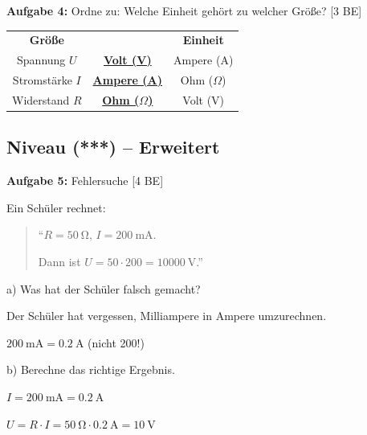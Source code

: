 \documentclass[11pt, a4paper]{article}
\newcommand{\lsg}[1]{\textcolor{loesung}{\textbf{\underline{#1}}}}
\newcommand{\niveauDrei}{\textcolor{stern3}{\textbf{(***)}}}}
\newcommand{\punkte}[1]{\hfill\textcolor{grau}{\small[#1 BE]}}
\begin{document}
\vspace{1em}

\textbf{Aufgabe 4:} Ordne zu: Welche Einheit gehört zu welcher Größe? \punkte{3}

\begin{center}
\begin{tabular}{ccc}
\textbf{Größe} & & \textbf{Einheit} \\[0.5em]
Spannung $U$ & \lsg{Volt (V)} & Ampere (A) \\
Stromstärke $I$ & \lsg{Ampere (A)} & Ohm ($\Omega$) \\
Widerstand $R$ & \lsg{Ohm ($\Omega$)} & Volt (V) \\
\end{tabular}
\end{center}

\vspace{1em}


\subsection*{Niveau \niveauDrei{} -- Erweitert}

\textbf{Aufgabe 5:} Fehlersuche \punkte{4}

Ein Schüler rechnet:

\begin{quote}
``$R = \SI{50}{\ohm}$, $I = \SI{200}{\milli\ampere}$.

Dann ist $U = 50 \cdot 200 = \SI{10000}{\volt}$.''
\end{quote}

a) Was hat der Schüler falsch gemacht?

\textcolor{loesung}{Der Schüler hat vergessen, Milliampere in Ampere umzurechnen.}

\textcolor{loesung}{$\SI{200}{\milli\ampere} = \SI{0,2}{\ampere}$ (nicht 200!)}

\vspace{0.5em}

b) Berechne das richtige Ergebnis.

\textcolor{loesung}{$I = \SI{200}{\milli\ampere} = \SI{0,2}{\ampere}$}

\textcolor{loesung}{$U = R \cdot I = \SI{50}{\ohm} \cdot \SI{0,2}{\ampere} = \SI{10}{\volt}$}

\vspace{1em}
\end{document}
